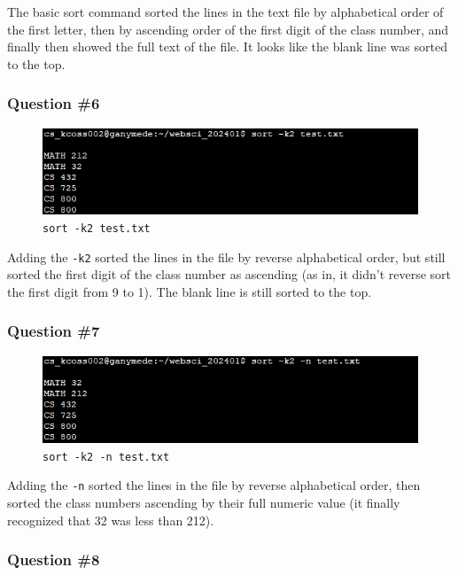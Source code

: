 \documentclass[
]{article}
\begin{document}
The basic sort command sorted the lines in the text file by alphabetical
order of the first letter, then by ascending order of the first digit of
the class number, and finally then showed the full text of the file. It
looks like the blank line was sorted to the top.

\hypertarget{question-6}{%
\subsubsection{Question \#6}\label{question-6}}

\begin{figure}
\centering
\includegraphics{linux_cmd_6_sortk2.png}
\caption{\texttt{sort\ -k2\ test.txt}}
\end{figure}

Adding the \texttt{-k2} sorted the lines in the file by reverse
alphabetical order, but still sorted the first digit of the class number
as ascending (as in, it didn't reverse sort the first digit from 9 to
1). The blank line is still sorted to the top.

\hypertarget{question-7}{%
\subsubsection{Question \#7}\label{question-7}}

\begin{figure}
\centering
\includegraphics{linux_cmd_7_sortk2n.png}
\caption{\texttt{sort\ -k2\ -n\ test.txt}}
\end{figure}

Adding the \texttt{-n} sorted the lines in the file by reverse
alphabetical order, then sorted the class numbers ascending by their
full numeric value (it finally recognized that 32 was less than 212).

\hypertarget{question-8}{%
\subsubsection{Question \#8}\label{question-8}}
\end{document}

